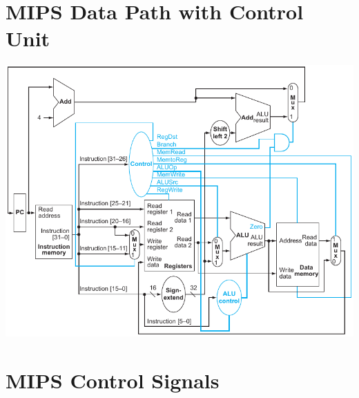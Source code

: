 \documentclass[11pt]{article}
\begin{document}
\begin{minipage}[t]{0.64\linewidth}
	\section*{MIPS Data Path with Control Unit}
	\includegraphics[width=\linewidth]{mips-cpu/fig417.pdf}

	\section*{MIPS Control Signals}
	
\end{minipage}
\hfill
\end{document}
